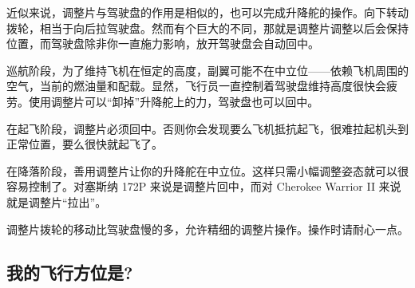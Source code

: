 近似来说，调整片与驾驶盘的作用是相似的，也可以完成升降舵的操作。向下转动拨轮，相当于向后拉驾驶盘。然而有个巨大的不同，那就是调整片调整以后会保持位置，而驾驶盘除非你一直施力影响，放开驾驶盘会自动回中。

巡航阶段，为了维持飞机在恒定的高度，副翼可能不在中立位——依赖飞机周围的空气，当前的燃油量和配载。显然，飞行员一直控制着驾驶盘维持高度很快会疲劳。使用调整片可以“卸掉”升降舵上的力，驾驶盘也可以回中。

在起飞阶段，调整片必须回中。否则你会发现要么飞机抵抗起飞，很难拉起机头到正常位置，要么很快就起飞了。

在降落阶段，善用调整片让你的升降舵在中立位。这样只需小幅调整姿态就可以很容易控制了。对塞斯纳 172P 来说是调整片回中，而对 Cherokee Warrior II 来说就是调整片“拉出”。

调整片拨轮的移动比驾驶盘慢的多，允许精细的调整片操作。操作时请耐心一点。

\subsection{我的飞行方位是?}
\label{sec:Kierunek}

